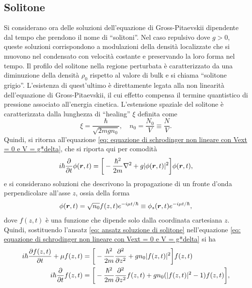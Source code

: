 \subsection{Solitone}
Si considerano ora delle soluzioni dell'equazione di Gross-Pitaevskii dipendente dal tempo che prendono il nome di  ``solitoni''. Nel caso repulsivo dove $g > 0$, queste soluzioni corrispondono a modulazioni della densità localizzate che si muovono nel condensato con velocità costante e preservando la loro forma nel tempo. Il profilo del solitone nella regione perturbata è caratterizzato da una diminuzione della densità $\rho_0$ rispetto al valore di bulk e si chiama ``solitone grigio''. L'esistenza di quest'ultimo è direttamente legata alla non linearità dell'equazione di Gross-Pitaevskii, il cui effetto compensa il termine quantistico di pressione associato all'energia cinetica. L'estensione spaziale del solitone è caratterizzata dalla lunghezza di ``healing'' $\xi$ definita come
\begin{equation}
\label{eq: lunghezza di healing}
    \xi = \frac{\hbar}{\sqrt{2m gn_0}},\quad n_0 = \frac{N_0}{V} \equiv \frac{N}{V}.
\end{equation}
Quindi, si ritorna all'equazione \eqref{eq: equazione di schrodinger non lineare con Vext = 0 e V = g*delta}, che si riporta qui per comodità 
\begin{equation}
    i\hbar\frac{\partial}{\partial t}\phi(\bm{r},t) = \bigg[-\frac{\hbar^2}{2m}\nabla^2 + g|\phi(\bm{r},t)|^2\bigg]\phi(\bm{r},t),
\end{equation}
e si considerano soluzioni che descrivono la propagazione di un fronte d'onda perpendicolare all'asse $z$, ossia della forma 
\begin{equation}
\label{eq: ansatz soluzione di solitone}
    \phi(\bm{r},t) = \sqrt{n_0}f(z,t)e^{-i\mu t/\hbar} \equiv \phi_s(\bm{r},t)e^{-i\mu t/\hbar},
\end{equation}
dove $f(z,t)$ è una funzione che dipende solo dalla coordinata cartesiana $z$. Quindi, sostituendo l'ansatz \eqref{eq: ansatz soluzione di solitone} nell'equazione \eqref{eq: equazione di schrodinger non lineare con Vext = 0 e V = g*delta} si ha
\begin{equation}
    \begin{split}
        i\hbar\frac{\partial f(z,t)}{\partial t} + \mu f(z,t) &= \bigg[-\frac{\hbar^2}{2m}\frac{\partial^2}{\partial z^2} + gn_0|f(z,t)|^2\bigg]f(z,t) \\
        i\hbar\frac{\partial}{\partial t}f(z,t) &= \bigg[-\frac{\hbar^2}{2m}\frac{\partial^2}{\partial z^2}f(z,t) + gn_0(|f(z,t)|^2 - 1)f(z,t)\bigg],
    \end{split}
\end{equation}
